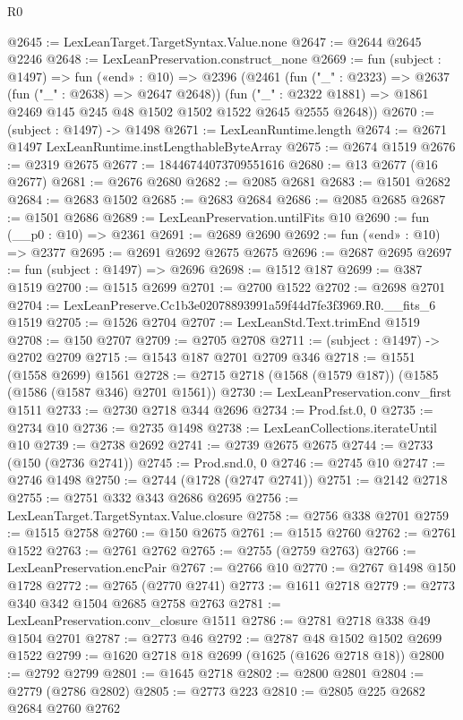 \begin{lexlean}{R0}
\begin{coremodule}
@2645 := LexLeanTarget.TargetSyntax.Value.none
@2647 := @2644 @2645 @2246
@2648 := LexLeanPreservation.construct_none
@2669 := fun (subject : @1497) =>
  fun («end» : @10) =>
  @2396
    (@2461
      (fun ("_" : @2323) => @2637 (fun ("_" : @2638) => @2647 @2648))
      (fun ("_" : @2322 @1881) => @1861 @2469 @145 @245 @48 @1502 @1502 @1522 @2645 @2555 @2648))
@2670 := (subject : @1497) -> @1498
@2671 := LexLeanRuntime.length
@2674 := @2671 @1497 LexLeanRuntime.instLengthableByteArray
@2675 := @2674 @1519
@2676 := @2319 @2675
@2677 := 18446744073709551616
@2680 := @13 @2677 (@16 @2677)
@2681 := @2676 @2680
@2682 := @2085 @2681
@2683 := @1501 @2682
@2684 := @2683 @1502
@2685 := @2683 @2684
@2686 := @2085 @2685
@2687 := @1501 @2686
@2689 := LexLeanPreservation.untilFits @10
@2690 := fun (__p0 : @10) => @2361
@2691 := @2689 @2690
@2692 := fun («end» : @10) => @2377
@2695 := @2691 @2692 @2675 @2675
@2696 := @2687 @2695
@2697 := fun (subject : @1497) => @2696
@2698 := @1512 @187
@2699 := @387 @1519
@2700 := @1515 @2699
@2701 := @2700 @1522
@2702 := @2698 @2701
@2704 := LexLeanPreserve.Cc1b3e02078893991a59f44d7fe3f3969.R0.__fits_6 @1519
@2705 := @1526 @2704
@2707 := LexLeanStd.Text.trimEnd @1519
@2708 := @150 @2707
@2709 := @2705 @2708
@2711 := (subject : @1497) -> @2702 @2709
@2715 := @1543 @187 @2701 @2709 @346
@2718 := @1551 (@1558 @2699) @1561
@2728 := @2715 @2718 (@1568 (@1579 @187)) (@1585 (@1586 (@1587 @346) @2701 @1561))
@2730 := LexLeanPreservation.conv_first @1511
@2733 := @2730 @2718 @344 @2696
@2734 := Prod.fst.{0, 0}
@2735 := @2734 @10
@2736 := @2735 @1498
@2738 := LexLeanCollections.iterateUntil @10
@2739 := @2738 @2692
@2741 := @2739 @2675 @2675
@2744 := @2733 (@150 (@2736 @2741))
@2745 := Prod.snd.{0, 0}
@2746 := @2745 @10
@2747 := @2746 @1498
@2750 := @2744 (@1728 (@2747 @2741))
@2751 := @2142 @2718
@2755 := @2751 @332 @343 @2686 @2695
@2756 := LexLeanTarget.TargetSyntax.Value.closure
@2758 := @2756 @338 @2701
@2759 := @1515 @2758
@2760 := @150 @2675
@2761 := @1515 @2760
@2762 := @2761 @1522
@2763 := @2761 @2762
@2765 := @2755 (@2759 @2763)
@2766 := LexLeanPreservation.encPair
@2767 := @2766 @10
@2770 := @2767 @1498 @150 @1728
@2772 := @2765 (@2770 @2741)
@2773 := @1611 @2718
@2779 := @2773 @340 @342 @1504 @2685 @2758 @2763
@2781 := LexLeanPreservation.conv_closure @1511
@2786 := @2781 @2718 @338 @49 @1504 @2701
@2787 := @2773 @46
@2792 := @2787 @48 @1502 @1502 @2699 @1522
@2799 := @1620 @2718 @18 @2699 (@1625 (@1626 @2718 @18))
@2800 := @2792 @2799
@2801 := @1645 @2718
@2802 := @2800 @2801
@2804 := @2779 (@2786 @2802)
@2805 := @2773 @223
@2810 := @2805 @225 @2682 @2684 @2760 @2762

\end{coremodule}
\end{lexlean}
